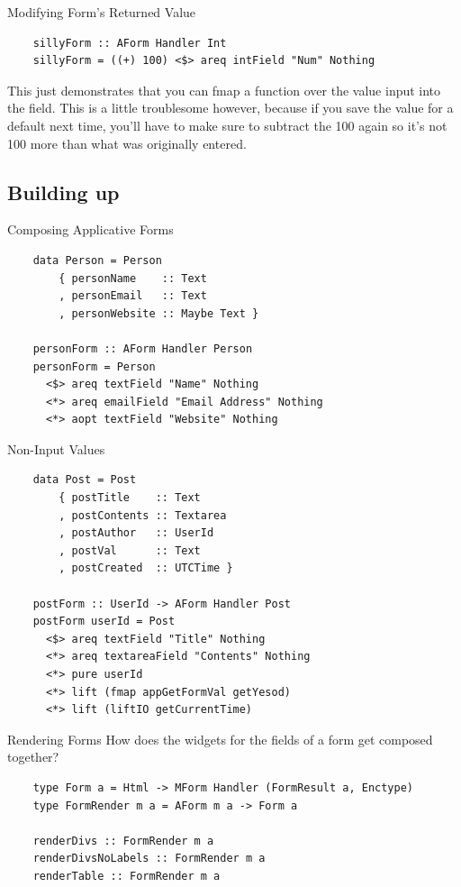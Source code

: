 \documentclass[pdf]{beamer}
\begin{document}
\begin{frame}[fragile]{Modifying Form's Returned Value}
  \begin{verbatim}
    sillyForm :: AForm Handler Int
    sillyForm = ((+) 100) <$> areq intField "Num" Nothing
  \end{verbatim}
  This just demonstrates that you can fmap a function over the value
  input into the field. This is a little troublesome however, because
  if you save the value for a default next time, you'll have to make
  sure to subtract the 100 again so it's not 100 more than what was
  originally entered.
\end{frame}

\subsection{Building up}
\begin{frame}[fragile]{Composing Applicative Forms}
  \begin{verbatim}
    data Person = Person
        { personName    :: Text
        , personEmail   :: Text
        , personWebsite :: Maybe Text }

    personForm :: AForm Handler Person
    personForm = Person
      <$> areq textField "Name" Nothing
      <*> areq emailField "Email Address" Nothing
      <*> aopt textField "Website" Nothing
  \end{verbatim}
\end{frame}

\begin{frame}[fragile]{Non-Input Values}
  \begin{verbatim}
    data Post = Post
        { postTitle    :: Text
        , postContents :: Textarea
        , postAuthor   :: UserId
        , postVal      :: Text
        , postCreated  :: UTCTime }

    postForm :: UserId -> AForm Handler Post
    postForm userId = Post
      <$> areq textField "Title" Nothing
      <*> areq textareaField "Contents" Nothing
      <*> pure userId
      <*> lift (fmap appGetFormVal getYesod)
      <*> lift (liftIO getCurrentTime)
  \end{verbatim}
\end{frame}

\begin{frame}[fragile]{Rendering Forms}
  How does the widgets for the fields of a form get composed together?
  \pause
  \begin{verbatim}
    type Form a = Html -> MForm Handler (FormResult a, Enctype)
    type FormRender m a = AForm m a -> Form a

    renderDivs :: FormRender m a
    renderDivsNoLabels :: FormRender m a
    renderTable :: FormRender m a
  \end{verbatim}
\end{frame}
\end{document}
